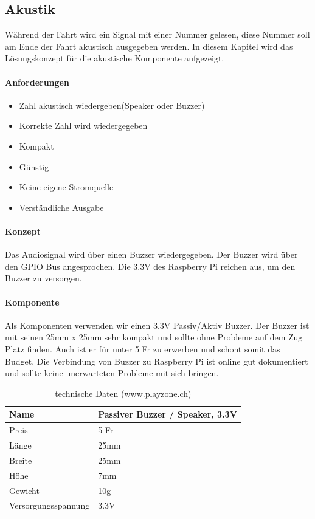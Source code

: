 \documentclass[../../main.tex]{subfiles}
\begin{document}
\subsection{Akustik}
Während der Fahrt wird ein Signal mit einer Nummer gelesen, diese Nummer soll am Ende der Fahrt akustisch ausgegeben werden. In diesem Kapitel wird das Lösungskonzept für die akustische Komponente aufgezeigt.

\paragraph{Anforderungen}
\begin{itemize}
    \item Zahl akustisch wiedergeben(Speaker oder Buzzer)
    \item Korrekte Zahl wird wiedergegeben
    \item Kompakt
    \item Günstig
    \item Keine eigene Stromquelle
    \item Verständliche Ausgabe
\end{itemize}

\paragraph{Konzept}
Das Audiosignal wird über einen Buzzer wiedergegeben. Der Buzzer wird über den GPIO Bus angesprochen. Die 3.3V des Raspberry Pi reichen aus, um den Buzzer zu versorgen.

\paragraph{Komponente}
Als Komponenten verwenden wir einen 3.3V Passiv/Aktiv Buzzer. Der Buzzer ist mit seinen 25mm x 25mm sehr kompakt und sollte ohne Probleme auf dem Zug Platz finden. Auch ist er für unter 5 Fr zu erwerben und schont somit das Budget. Die Verbindung von Buzzer zu Raspberry Pi ist online gut dokumentiert und sollte keine unerwarteten Probleme mit sich bringen.

\begin{table}[H]
\begin{center}
\begin{tabular}{ll}
Name & Passiver Buzzer / Speaker, 3.3V \\ \hline
Preis & 5 Fr    \\ \hline
Länge & 25mm    \\ \hline
Breite & 25mm   \\ \hline
Höhe & 7mm      \\ \hline
Gewicht & 10g   \\ \hline
Versorgungsspannung & 3.3V \\ \hline
\end{tabular}
\caption{technische Daten (www.playzone.ch)}
\end{center}
\end{table}
\end{document}
